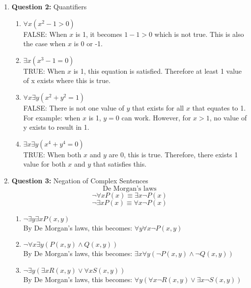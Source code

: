 \documentclass[11pt]{article}
\begin{document}
\begin{enumerate}
\item
\textbf{Question 2:} Quantifiers 
\begin{enumerate}[label=(\alph*)]
    \item
    $\forall x(x^2-1 > 0)$ \\
    FALSE: When $x$ is 1, it becomes $1-1 > 0$ which is not true. This is also the case when $x$ is 0 or -1.
    \item
    $\exists x(x^3-1 = 0)$ \\
    TRUE: When $x$ is 1, this equation is satisfied. Therefore at least 1 value of x exists where this is true.
    \item 
    $\forall x \exists y(x^2+y^2 = 1)$ \\
    FALSE: There is not one value of $y$ that exists for all $x$ that equates to 1. For example: when $x$ is 1, $y = 0$ can work. However, for $x > 1$, no value of y exists to result in 1. 
    \item 
    $\exists x \exists y(x^4+y^4=0)$ \\
    TRUE: When both $x$ and $y$ are 0, this is true. Therefore, there exists 1 value for both $x$ and $y$ that satisfies this.
\end{enumerate}
\item
\textbf{Question 3:} Negation of Complex Sentences
\begin{equation*}
    \text{De Morgan's laws} 
\end{equation*}
\begin{equation*}
    \lnot \forall xP(x) \equiv \exists x \lnot P(x) 
\end{equation*}
\begin{equation*}
    \lnot \exists xP(x) \equiv \forall x \lnot P(x) 
\end{equation*}
\begin{enumerate}[label=(\alph*)]
    \item
    $\lnot \exists y \exists xP(x,y)$ \\
    By De Morgan's laws, this becomes: $\forall y \forall x \lnot P(x,y)$
    \item 
    $\lnot \forall x \exists y(P(x, y) \wedge Q(x, y))$ \\
    By De Morgan's laws, this becomes:  $\exists x \forall y (\lnot P(x, y) \wedge \lnot Q(x, y))$
    \item 
    $\lnot \exists y(\exists xR(x,y) \vee \forall xS(x, y))$ \\
    By De Morgan's laws, this becomes: $\forall y (\forall x \lnot R(x,y) \vee \exists x \lnot S(x, y))$

\end{enumerate}
\end{enumerate}
\end{document}

